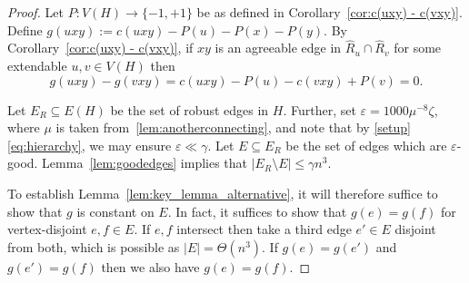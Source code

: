 \documentclass[A4paper,12pt]{article}
\theoremstyle{definition}
\newcommand{\eps}{\varepsilon}
\begin{document}
\begin{proof}[Proof]
    Let $P:V(H) \rightarrow \{-1,+1\}$ be as defined in Corollary~\ref{cor:c(uxy) - c(vxy)}.
    Define $g(uxy) := c(uxy) - P(u) - P(x) - P(y)$.   
   By Corollary~\ref{cor:c(uxy) - c(vxy)}, if $xy$ is an agreeable edge in $\hat{R}_u \cap \hat{R}_v$ for some extendable $u,v\in V(H)$ then \begin{equation}
   \label{nonannoying}
   g(uxy) - g(vxy) = c(uxy) - P(u) - c(vxy) + P(v) = 0.
   \end{equation}
  
Let $E_R\subseteq E(H)$ be the set of robust edges in $H$. Further, set $\eps = 1000\mu^{-8}\zeta$, where $\mu$ is taken from~\cref{lem:anotherconnecting}, and note that by \cref{setup} \eqref{eq:hierarchy}, we may ensure $\eps \ll \gamma$. Let $E\subseteq E_R$ be the set of edges which are $\eps$-good. Lemma~\ref{lem:goodedges} implies that
$ |E_R\setminus E|\leq \gamma n^3.$
 
To establish Lemma~\ref{lem:key_lemma_alternative}, it will therefore suffice to show that $g$ is constant on  $E$. In fact, it suffices to show that $g(e)=g(f)$ for vertex-disjoint $e,f \in E$. If $e,f$ intersect then take a third edge $e' \in E$ disjoint from both, which is possible as $|E| = \Theta(n^3)$. If $g(e) = g(e')$ and $g(e') = g(f)$ then we also have $g(e) = g(f)$.


\end{proof}
\end{document}
